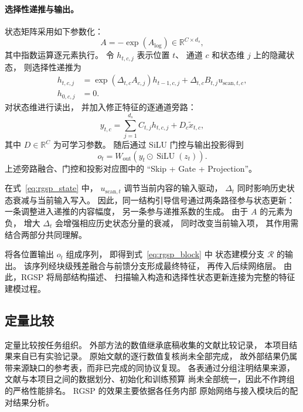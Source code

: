 \documentclass[journal]{IEEEtran}
\begin{document}
\paragraph{选择性递推与输出。}
状态矩阵采用如下参数化：
\begin{equation}
A=-\exp(A_{\log})
\in\mathbb{R}^{C\times d_s},
\label{eq:state_matrix}
\end{equation}
其中指数运算逐元素执行。
令 $h_{t,c,j}$ 表示位置 $t$、
通道 $c$ 和状态维 $j$ 上的隐藏状态，
则选择性递推为
\begin{equation}
\begin{aligned}
h_{t,c,j}&=\exp\left(\Delta_{t,c}A_{c,j}\right)h_{t-1,c,j}
+\Delta_{t,c}B_{t,j}u_{\mathrm{scan},t,c},\\
h_{0,c,j}&=0.
\end{aligned}
\label{eq:rgsp_state}
\end{equation}
对状态维进行读出，
并加入修正特征的逐通道旁路：
\begin{equation}
y_{t,c}
=
\sum_{j=1}^{d_s}C_{t,j}h_{t,c,j}
+
D_c\tilde{x}_{t,c},
\label{eq:ssm_readout}
\end{equation}
其中 $D\in\mathbb{R}^{C}$ 为可学习参数。
随后通过 SiLU 门控与输出投影得到
\begin{equation}
o_t
=
W_{\mathrm{out}}
\left(
y_t\odot\operatorname{SiLU}(z_t)
\right).
\label{eq:rgsp_output}
\end{equation}
上述旁路融合、门控和投影对应图中的
``Skip + Gate + Projection''。

在式~\eqref{eq:rgsp_state} 中，
$u_{\mathrm{scan},t}$ 调节当前内容的输入驱动，
$\Delta_t$ 同时影响历史状态衰减与当前输入写入。
因此，同一结构引导信号通过两条路径参与状态更新：
一条调整进入递推的内容幅度，
另一条参与递推系数的生成。
由于 $A$ 的元素为负，
增大 $\Delta_t$ 会增强相应历史状态分量的衰减，
同时改变当前输入项，
其作用需结合两部分共同理解。

将各位置输出 $o_t$ 组成序列，
即得到式~\eqref{eq:rgsp_block} 中
状态建模分支 $\mathcal{R}$ 的输出。
该序列经块级残差融合与前馈分支形成最终特征，
再传入后续网络层。
由此，RGSP 将局部结构描述、
扫描输入构造和选择性状态更新连接为完整的特征建模过程。


\subsection{定量比较}
\label{sec:quantitative_comparison}

定量比较按任务组织。
外部方法的数值继承底稿收集的文献比较记录，
本项目结果来自已有实验记录。
原始文献的逐行数值复核尚未全部完成，
故外部结果仍属带来源缺口的参考表，而非已完成的同协议复现。
各表通过分组注明结果来源，
文献与本项目之间的数据划分、初始化和训练预算
尚未全部统一，因此不作跨组的严格性能排名。
RGSP 的效果主要依据各任务内部
原始网络与接入模块后的配对结果分析。
\end{document}
